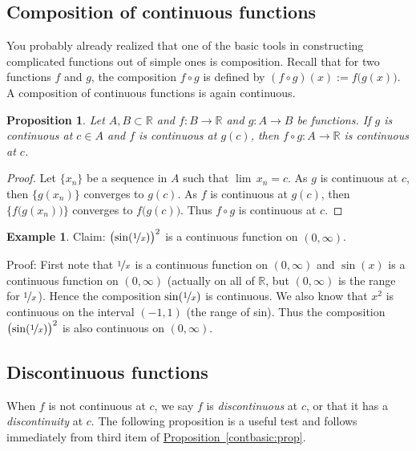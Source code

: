 \documentclass[12pt]{book}
\newcommand{\R}{{\mathbb{R}}}
\newcommand{\myindex}[1]{#1\index{#1}}
\theoremstyle{plain}
\newtheorem{prop}[thm]{Proposition}
\theoremstyle{remark}
\theoremstyle{definition}
\theoremstyle{exercise}
\theoremstyle{example}
\newtheorem{example}[thm]{Example}
\newcommand{\propref}[1]{\hyperref[#1]{Proposition~\ref*{#1}}}
\begin{document}
\subsection{Composition of continuous functions}

You probably already realized that one of the basic tools in
constructing complicated functions out of simple ones is composition.
Recall that for two functions $f$ and $g$,
the composition $f \circ g$ is defined by
$(f \circ g)(x) := f\bigl(g(x)\bigr)$.
A composition of
continuous functions is again
continuous.

\begin{prop}
Let $A, B \subset \R$ and $f \colon B \to \R$ and $g \colon A \to B$ be
functions.  If $g$ is continuous at $c \in A$ and
$f$ is continuous at $g(c)$, then $f \circ g \colon A \to \R$ is continuous
at $c$.
\end{prop}

\begin{proof}
Let $\{ x_n \}$ be a sequence in $A$ such that $\lim\, x_n = c$.
As $g$ is continuous at $c$, then $\{ g(x_n) \}$ converges to $g(c)$.
As $f$ is continuous at $g(c)$, then $\{ f\bigl(g(x_n)\bigr) \}$ converges
to $f\bigl(g(c)\bigr)$.
Thus $f \circ g$ is continuous at $c$.
\end{proof}

\begin{example}
Claim: ${\bigl(\sin(\nicefrac{1}{x})\bigr)}^2$ is a continuous function on $(0,\infty)$.

Proof: First note that $\nicefrac{1}{x}$ is a continuous function on
$(0,\infty)$ and $\sin(x)$ is a continuous function on $(0,\infty)$ (actually
on all of $\R$, but $(0,\infty)$ is the range for $\nicefrac{1}{x}$).
Hence the composition $\sin(\nicefrac{1}{x})$ is continuous.  We also
know that $x^2$ is continuous on the interval $(-1,1)$ (the range of sin).  Thus
the composition
${\bigl(\sin(\nicefrac{1}{x})\bigr)}^2$ is also continuous on $(0,\infty)$.
\end{example}

\subsection{Discontinuous functions}

When $f$ is not continuous at $c$, we
say $f$ is \emph{\myindex{discontinuous}} at $c$, or that it has a
\emph{\myindex{discontinuity}} at $c$.
The following proposition is a useful test and follows immediately
from third item of \propref{contbasic:prop}.
\end{document}
